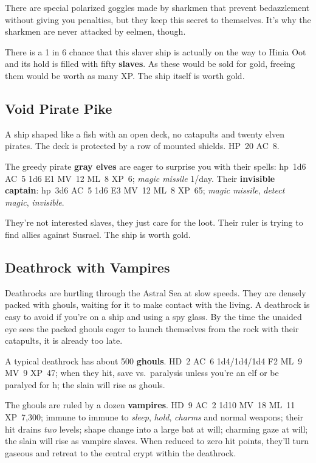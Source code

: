 \documentclass[11pt]{bxart}
\begin{document}
There are special polarized goggles made by sharkmen that prevent
bedazzlement without giving you penalties, but they keep this secret
to themselves. It's why the sharkmen are never attacked by eelmen,
though.

There is a 1 in 6 chance that this slaver ship is actually on the way
to Hinia Oot and its hold is filled with fifty \textbf{slaves}. As
these would be sold for \unit[25,000]{gold}, freeing them would be
worth as many XP. The ship itself is worth \unit[50,000]{gold}.

\subsection{Void Pirate Pike}

A ship shaped like a fish with an open deck, no catapults and twenty
elven pirates. The deck is protected by a row of mounted shields.
HP~20 AC~8.

The greedy pirate \textbf{gray elves} are eager to surprise you with
their spells: hp~1d6 AC~5 1d6 E1 MV~12 ML~8 XP~6; \emph{magic missile}
1/day. Their \textbf{invisible captain}: hp~3d6 AC~5 1d6 E3 MV~12 ML~8
XP~65; \emph{magic missile}, \emph{detect magic}, \emph{invisible}.

They're not interested slaves, they just care for the loot. Their
ruler is trying to find allies against Susrael. The ship is worth
\unit[20,000]{gold}.

\subsection{Deathrock with Vampires}

Deathrocks are hurtling through the Astral Sea at slow speeds. They
are densely packed with ghouls, waiting for it to make contact with
the living. A deathrock is easy to avoid if you're on a ship and using
a spy glass. By the time the unaided eye sees the packed ghouls eager
to launch themselves from the rock with their catapults, it is already
too late.

A typical deathrock has about 500 \textbf{ghouls}. HD~2 AC~6
1d4/1d4/1d4 F2 ML~9 MV~9 XP~47; when they hit, save vs.~paralysis
unless you're an elf or be paralyed for \unit[1]{h}; the slain will
rise as ghouls.

The ghouls are ruled by a dozen \textbf{vampires}. HD~9 AC~2 1d10
MV~18 ML~11 XP~7,300; immune to immune to \textit{sleep},
\textit{hold}, \textit{charms} and normal weapons; their hit drains
\emph{two} levels; shape change into a large bat at will; charming
gaze at will; the slain will rise as vampire slaves. When reduced to
zero hit points, they'll turn gaseous and retreat to the central crypt
within the deathrock.
\end{document}
